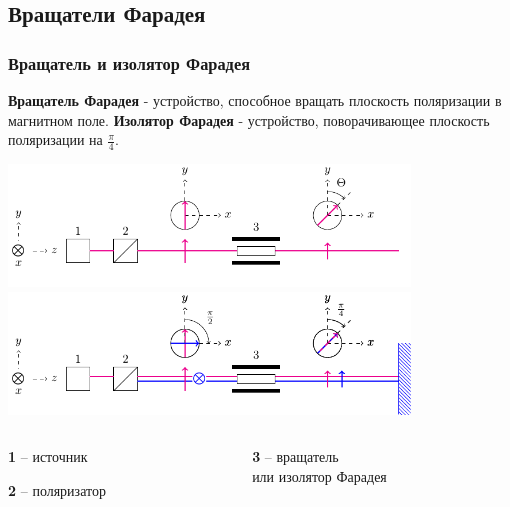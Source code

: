 \documentclass[10pt,pdf,hyperref={unicode}, dvipsnames]{beamer}
\begin{document}

\begin{frame}[t]
	\subsection{Вращатели Фарадея}
	\frametitle{Вращатель и изолятор Фарадея}
	\textbf{Вращатель Фарадея} - устройство, способное вращать плоскость поляризации в магнитном поле. \textbf{Изолятор Фарадея} - устройство, поворачивающее плоскость поляризации на $\frac{\pi}{4}$. 
	\begin{center}
		\includegraphics[width=0.8\textwidth]{images/rot}\\
		\includegraphics[width=0.8\textwidth]{images/zerc}
	\end{center}
	\begin{columns}
		\hspace{2.5cm}
		\begin{column}{0.3\textwidth}
			
			\textbf{1} -- источник
			
			\textbf{2} -- поляризатор
			
		\end{column}
		\hspace{1.6cm}
		\begin{column}{0.7\textwidth}
			
			\textbf{3} -- вращатель\\
			или изолятор Фарадея
		\end{column}
	\end{columns}
\end{frame}

\end{document}
